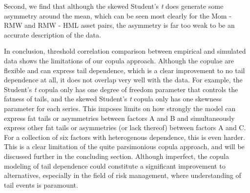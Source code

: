 Second, we find that although the skewed Student's \textit{t} does generate some asymmetry around the mean, which can be seen most clearly for the Mom - RMW and RMW - HML asset pairs, the asymmetry is far too weak to be an accurate description of the data. 

In conclusion, threshold correlation comparison between empirical and simulated data shows the limitations of our copula approach. Although the copulae are flexible and can express tail dependence, which is a clear improvement to no tail dependence at all, it does not overlap very well with the data. For example, the Student's \textit{t} copula only has one degree of freedom parameter that controls the fatness of tails, and the skewed Student's \textit{t} copula only has one skewness parameter for each series. This imposes limits on how strongly the model can express fat tails or asymmetries between factors A and B and simultaneously express other fat tails or asymmetries (or lack thereof) between factors A and C. For a collection of six factors with heterogenous dependence, this is even harder. This is a clear limitation of the quite parsimonious copula approach, and will be discussed further in the concluding section. Although imperfect, the copula modeling of tail dependence could constitute a significant improvement to alternatives, especially in the field of risk management, where understanding of tail events is paramount.

